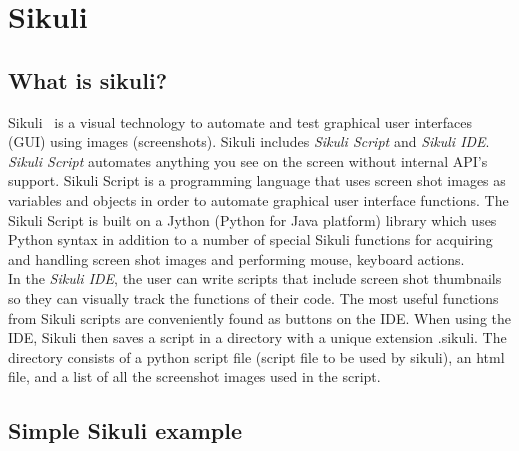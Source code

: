 \documentclass{InsightArticle}
\begin{document}

\section{Sikuli}

\subsection{What is sikuli?}

Sikuli~\cite{Sikuli:Documentation,Sikuli:Website,Yeh:2009:Sikuli} is a visual
technology to automate and test graphical user interfaces (GUI) using images
(screenshots). Sikuli includes \emph{Sikuli Script} and \emph{Sikuli IDE}.\\

\emph{Sikuli Script} automates anything you see on the screen without internal
API's support. Sikuli Script is a programming language that uses screen shot
images as variables and objects in order to automate graphical user interface
functions. The Sikuli Script is built on a Jython (Python for Java platform)
library which uses Python syntax in addition to a number of special Sikuli
functions for acquiring and handling screen shot images and performing mouse,
keyboard actions.\\

In the \emph{Sikuli IDE}, the user can write scripts that include screen shot
thumbnails so they can visually track the functions of their code. The most
useful functions from Sikuli scripts are conveniently found as
buttons on the IDE. When using the IDE, Sikuli then saves a script in a
directory with a unique extension .sikuli. The directory consists of a python
script file (script file to be used by sikuli), an html file, and a list of all
the screenshot images used in the script.


\subsection{Simple Sikuli example} %
\end{document}

